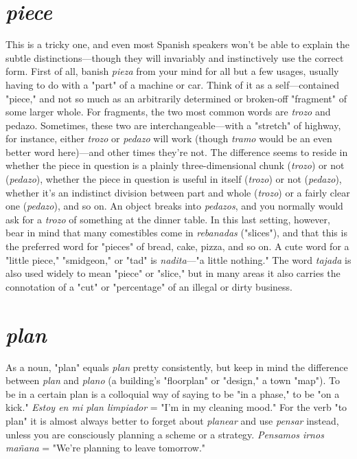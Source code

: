 \section{\emph{piece}}

This is a tricky one, and even most Spanish speakers won't be
able to explain the subtle distinctions---though they will invariably
and instinctively use the correct form. First of all, banish \emph{pieza} from
your mind for all but a few usages, usually having to do with a "part"
of a machine or car. Think of it as a self---contained "piece," and not so
much as an arbitrarily determined or broken-off "fragment" of some
larger whole.
For fragments, the two most common words are \emph{trozo} and
pedazo. Sometimes, these two are interchangeable---with a "stretch"
of highway, for instance, either \emph{trozo} or \emph{pedazo} will work (though
\emph{tramo} would be an even better word here)---and other times they're
not. The difference seems to reside in whether the piece in question is
a plainly three-dimensional chunk (\emph{trozo}) or not (\emph{pedazo}), whether the
piece in question is useful in itself (\emph{trozo}) or not (\emph{pedazo}), whether it's
an indistinct division between part and whole (\emph{trozo}) or a fairly clear
one (\emph{pedazo}), and so on. An object breaks into \emph{pedazos}, and you normally would ask for a \emph{trozo} of something at the dinner table.
In this last setting, however, bear in mind that many comestibles come in \emph{rebanadas} ("slices"), and that this is the preferred word
for "pieces" of bread, cake, pizza, and so on. A cute word for a "little
piece," "smidgeon," or "tad" is \emph{nadita}---"a little nothing." The word
\emph{tajada} is also used widely to mean "piece" or "slice," but in many
areas it also carries the connotation of a "cut" or "percentage" of an
illegal or dirty business.

\section{\emph{plan}}

As a noun, "plan" equals \emph{plan} pretty consistently, but keep in
mind the difference between \emph{plan} and \emph{plano} (a building's "floorplan"
or "design," a town "map"). To be in a certain plan is a colloquial way
of saying to be "in a phase," to be "on a kick." \emph{Estoy en mi plan limpiador} = "I'm in my cleaning mood." For the verb "to plan" it is almost always better to forget about \emph{planear} and use \emph{pensar} instead,
unless you are consciously planning a scheme or a strategy. \emph{Pensamos
irnos mañana} = "We're planning to leave tomorrow."


